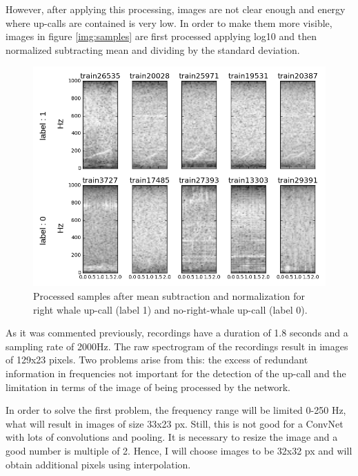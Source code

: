 \documentclass[]{article}
\begin{document}
However, after applying this processing, images are not clear enough and energy where up-calls are contained is very low. In order to make them more visible, images in figure \ref{img:samples} are first processed applying log10 and then normalized subtracting mean and dividing by the standard deviation.

\begin{figure}[htpb!]
\centering
\includegraphics[width= \textwidth]{./images/2_samples_processed}
\caption{Processed samples after mean subtraction and normalization for right whale up-call (label 1) and no-right-whale up-call (label 0).  \label{img:samples_processed}}
\end{figure} 

As it was commented previously, recordings have a duration of 1.8 seconds and a sampling rate of 2000Hz. The raw spectrogram of the recordings result in images of 129x23 pixels. Two problems arise from this: the excess of redundant information in frequencies not important for the detection of the up-call and the limitation in terms of the image of being processed by the network.

In order to solve the first problem, the frequency range will be limited 0-250 Hz, what will result in images of size 33x23 px. Still, this is not good for a ConvNet with lots of convolutions and pooling. It is necessary to resize the image and a good number is multiple of 2. Hence, I will choose images to be 32x32 px and will obtain additional pixels using interpolation. %
\end{document}
